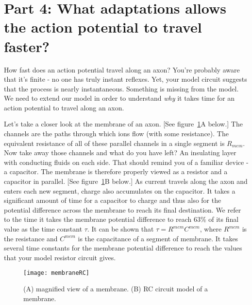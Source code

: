 \section*{Part 4: What adaptations allows the action potential to travel faster?}
How fast does an action potential travel along an axon?
You're probably aware that it's finite - no one has truly instant reflexes.
Yet, your model circuit suggests that the process is nearly instantaneous.
Something is missing from the model.
We need to extend our model in order to understand \emph{why} it takes time for an action potential to travel along an axon.
\par 
Let's take a closer look at the membrane of an axon.
[See figure~\ref{fig:memRC}A below.]
The channels are the paths through which ions flow (with some resistance).
The equivalent resistance of all of these parallel channels in a single segment is $R_{mem}$.
Now take away those channels and what do you have left?
An insulating layer with conducting fluids on each side.
That should remind you of a familiar device - a capacitor.
The membrane is therefore properly viewed as a resistor and a capacitor in parallel.
[See figure~\ref{fig:memRC}B below.]
As current travels along the axon and enters each new segment, charge also accumulates on the capacitor.
It takes a significant amount of time for a capacitor to charge and thus also for the potential difference across the membrane to reach its final destination.
We refer to the time it takes the membrane potential difference to reach 63\% of its final value as the time constant $\tau$.
It can be shown that $\tau = R^{mem}C^{mem}$, where $R^{mem}$ is the resistance and $C^{mem}$ is the capacitance of a segment of membrane.
It takes several time constants for the membrane potential difference to reach the values that your model resistor circuit gives.
\begin{figure}[hbtp]
\centering
\texttt{[image: membraneRC]}
\caption{(A) magnified view of a membrane. (B) RC circuit model of a membrane.}
\label{fig:memRC}
\vspace{-20pt}
\end{figure}


